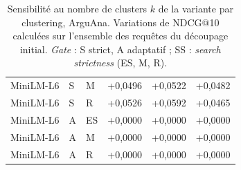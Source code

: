 \documentclass[a4paper,10pt]{article}
\begin{document}
\begin{table}[p]
\begin{tabular}{lllrrr}
MiniLM-L6 & S & M & +0,0496 & +0,0522 & +0,0482 \\
MiniLM-L6 & S & R & +0,0526 & +0,0592 & +0,0465 \\
MiniLM-L6 & A & ES & +0,0000 & +0,0000 & +0,0000 \\
MiniLM-L6 & A & M & +0,0000 & +0,0000 & +0,0000 \\
MiniLM-L6 & A & R & +0,0000 & +0,0000 & +0,0000 \\
\bottomrule
\end{tabular}
\caption{Sensibilité au nombre de clusters $k$ de la variante par clustering, ArguAna. Variations de NDCG@10 calculées sur l'ensemble des requêtes du découpage initial. \textit{Gate} : S strict, A adaptatif ; SS : \textit{search strictness} (ES, M, R).}
\label{tab:s-clusters-arguana}
\end{table}
\end{document}
